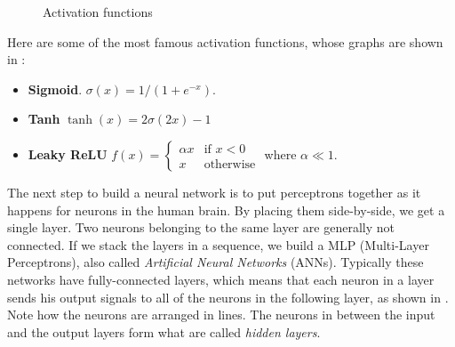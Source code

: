\documentclass[12pt,a4paper]{report}
\theoremstyle{definition}
\begin{document}
\begin{figure}[h]
    \centering
    \caption{Activation functions}
    \label{fig:activation func}
\end{figure}
Here are some of the most famous activation functions, whose graphs are shown in :
\begin{itemize}
    \item \textbf{Sigmoid}. $\sigma (x) = 1/(1+ e^{-x})$.
    \item \textbf{Tanh} $\tanh(x)= 2\sigma (2x)-1$
    \item \textbf{Leaky ReLU} $f(x)=\begin{cases}
    \alpha x  & \text{if  } x<0 \\
    x & \text{otherwise}
    \end{cases}$
      where $\alpha \ll 1$.
\end{itemize}

The next step to build a neural network is to put perceptrons together as it happens for neurons in the human brain. By placing them side-by-side, we get a single layer.
Two neurons belonging to the same layer are generally not connected.
If we stack the layers in a sequence, we build a MLP (Multi-Layer Perceptrons), also called \emph{Artificial Neural Networks} (ANNs).
Typically these networks have fully-connected layers, which means that each neuron in a layer sends his output signals to all of the neurons in the following layer, as shown in .
Note how the neurons are arranged in lines.
The neurons in between the input and the output layers form what are called \emph{hidden layers}.
\end{document}
